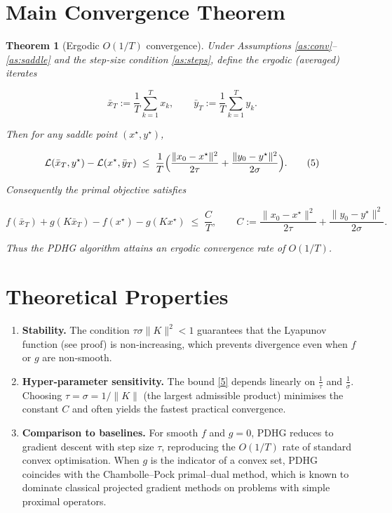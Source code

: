 \documentclass{article}
\newtheorem{theorem}{Theorem}
\begin{document}
\section*{Main Convergence Theorem}
\begin{theorem}[Ergodic $O(1/T)$ convergence]\label{thm:ergodic}
Under Assumptions \ref{as:conv}–\ref{as:saddle} and the step‑size condition \eqref{as:steps}, define the ergodic (averaged) iterates  

\[
\bar x_{T}:=\frac{1}{T}\sum_{k=1}^{T}x_{k},\qquad 
\bar y_{T}:=\frac{1}{T}\sum_{k=1}^{T}y_{k}.
\]

Then for any saddle point $(x^{\star},y^{\star})$,

\[
\mathcal{L}(\bar x_{T},y^{\star})-\mathcal{L}(x^{\star},\bar y_{T})
\;\le\;
\frac{1}{T}\Bigl(\frac{\|x_{0}-x^{\star}\|^{2}}{2\tau}
      +\frac{\|y_{0}-y^{\star}\|^{2}}{2\sigma}\Bigr).
\tag{5}
\]

Consequently the primal objective satisfies  

\[
f(\bar x_{T})+g(K\bar x_{T})-f(x^{\star})-g(Kx^{\star})
\;\le\; \frac{C}{T},
\qquad
C:=\frac{\|x_{0}-x^{\star}\|^{2}}{2\tau}
      +\frac{\|y_{0}-y^{\star}\|^{2}}{2\sigma}.
\tag{6}
\]

Thus the PDHG algorithm attains an \emph{ergodic} convergence rate of $O(1/T)$.
\end{theorem}

\section*{Theoretical Properties}
\begin{enumerate}
\item \textbf{Stability.} The condition $\tau\sigma\|K\|^{2}<1$ guarantees that the Lyapunov function (see proof) is non‑increasing, which prevents divergence even when $f$ or $g$ are non‑smooth.
\item \textbf{Hyper‑parameter sensitivity.} The bound \eqref{5} depends linearly on $\frac{1}{\tau}$ and $\frac{1}{\sigma}$. Choosing $\tau=\sigma=1/\|K\|$ (the largest admissible product) minimises the constant $C$ and often yields the fastest practical convergence.
\item \textbf{Comparison to baselines.} For smooth $f$ and $g=0$, PDHG reduces to gradient descent with step size $\tau$, reproducing the $O(1/T)$ rate of standard convex optimisation. When $g$ is the indicator of a convex set, PDHG coincides with the Chambolle–Pock primal–dual method, which is known to dominate classical projected gradient methods on problems with simple proximal operators.
\end{enumerate}
\end{document}
